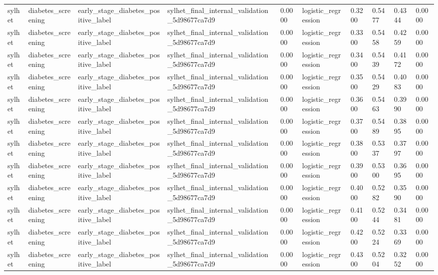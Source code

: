 \begin{tabular}{llllllllll}
sylhet & diabetes\_screening & early\_stage\_diabetes\_positive\_label & sylhet\_final\_internal\_validation\_5d98677ca7d9 & 0.0000 & logistic\_regression & 0.3200 & 0.5477 & 0.4344 & 0.0000 \\
sylhet & diabetes\_screening & early\_stage\_diabetes\_positive\_label & sylhet\_final\_internal\_validation\_5d98677ca7d9 & 0.0000 & logistic\_regression & 0.3300 & 0.5458 & 0.4259 & 0.0000 \\
sylhet & diabetes\_screening & early\_stage\_diabetes\_positive\_label & sylhet\_final\_internal\_validation\_5d98677ca7d9 & 0.0000 & logistic\_regression & 0.3400 & 0.5439 & 0.4172 & 0.0000 \\
sylhet & diabetes\_screening & early\_stage\_diabetes\_positive\_label & sylhet\_final\_internal\_validation\_5d98677ca7d9 & 0.0000 & logistic\_regression & 0.3500 & 0.5429 & 0.4083 & 0.0000 \\
sylhet & diabetes\_screening & early\_stage\_diabetes\_positive\_label & sylhet\_final\_internal\_validation\_5d98677ca7d9 & 0.0000 & logistic\_regression & 0.3600 & 0.5463 & 0.3990 & 0.0000 \\
sylhet & diabetes\_screening & early\_stage\_diabetes\_positive\_label & sylhet\_final\_internal\_validation\_5d98677ca7d9 & 0.0000 & logistic\_regression & 0.3700 & 0.5489 & 0.3895 & 0.0000 \\
sylhet & diabetes\_screening & early\_stage\_diabetes\_positive\_label & sylhet\_final\_internal\_validation\_5d98677ca7d9 & 0.0000 & logistic\_regression & 0.3800 & 0.5337 & 0.3797 & 0.0000 \\
sylhet & diabetes\_screening & early\_stage\_diabetes\_positive\_label & sylhet\_final\_internal\_validation\_5d98677ca7d9 & 0.0000 & logistic\_regression & 0.3900 & 0.5300 & 0.3695 & 0.0000 \\
sylhet & diabetes\_screening & early\_stage\_diabetes\_positive\_label & sylhet\_final\_internal\_validation\_5d98677ca7d9 & 0.0000 & logistic\_regression & 0.4000 & 0.5282 & 0.3590 & 0.0000 \\
sylhet & diabetes\_screening & early\_stage\_diabetes\_positive\_label & sylhet\_final\_internal\_validation\_5d98677ca7d9 & 0.0000 & logistic\_regression & 0.4100 & 0.5244 & 0.3481 & 0.0000 \\
sylhet & diabetes\_screening & early\_stage\_diabetes\_positive\_label & sylhet\_final\_internal\_validation\_5d98677ca7d9 & 0.0000 & logistic\_regression & 0.4200 & 0.5224 & 0.3369 & 0.0000 \\
sylhet & diabetes\_screening & early\_stage\_diabetes\_positive\_label & sylhet\_final\_internal\_validation\_5d98677ca7d9 & 0.0000 & logistic\_regression & 0.4300 & 0.5204 & 0.3252 & 0.0000 \\

\end{tabular}
